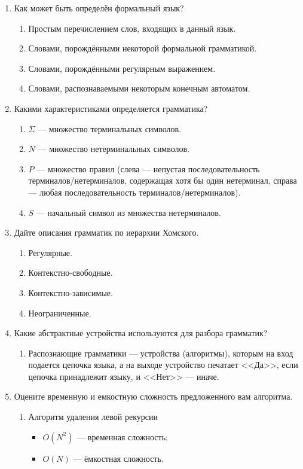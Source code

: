 \documentclass{bmstu}
\begin{document}
\begin{enumerate}
    \item Как может быть определён формальный язык?
    \begin{enumerate}
        \item Простым перечислением слов, входящих в данный язык.
        \item Словами, порождёнными некоторой формальной грамматикой.
        \item Словами, порождёнными регулярным выражением.
        \item Словами, распознаваемыми некоторым конечным автоматом.
    \end{enumerate}
    \item Какими характеристиками определяется грамматика?
    \begin{enumerate}
        \item $\Sigma$ --- множество терминальных символов.
        \item $N$ --- множество нетерминальных символов.
        \item $P$ --- множество правил (слева --- непустая последовательность терминалов/нетерминалов, содержащая хотя бы один нетерминал, справа --- любая последовательность терминалов/нетерминалов).
        \item $S$ --- начальный символ из множества нетерминалов.
    \end{enumerate}
    \item Дайте описания грамматик по иерархии Хомского.
    \begin{enumerate}
        \item Регулярные.
        \item Контекстно-свободные.
        \item Контекстно-зависимые.
        \item Неограниченные.
    \end{enumerate}
    \item Какие абстрактные устройства используются для разбора грамматик?
    \begin{enumerate}
        \item Распознающие грамматики --- устройства (алгоритмы), которым на вход подается цепочка языка, а на выходе устройство печатает <<Да>>, если цепочка принадлежит языку, и <<Нет>> --- иначе.
    \end{enumerate}
    \item Оцените временную и емкостную сложность предложенного вам алгоритма.
    \begin{enumerate}
        \item Алгоритм удаления левой рекурсии
        \begin{itemize}
            \item $O(N^2)$ --- временная сложность;
            \item $O(N)$ --- ёмкостная сложность.
        \end{itemize}
    \end{enumerate}
\end{enumerate}
\end{document}
